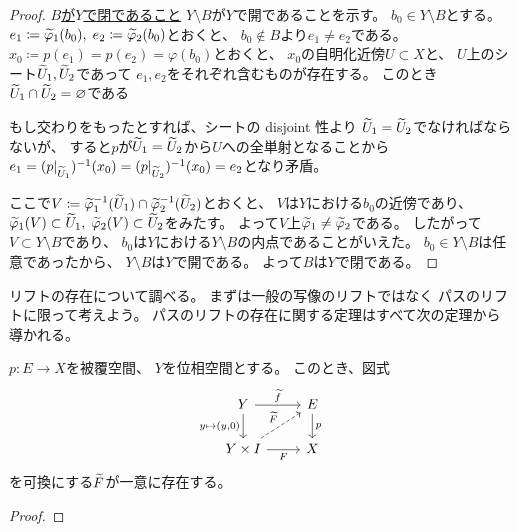 \documentclass[report]{jlreq}
\begin{document}
\begin{proof}
    \noindent
    \uline{$B$が$Y$で閉であること} \quad
    $Y \setminus B$が$Y$で開であることを示す。
    $b_0 \in Y \setminus B$とする。
    $e_1 \coloneqq \widetilde{\varphi}_1(b_0),\;
    e_2 \coloneqq \widetilde{\varphi}_2(b_0)$とおくと、
    $b_0 \not\in B$より$e_1 \neq e_2$である。
    $x_0 \coloneqq p(e_1) = p(e_2) = \varphi(b_0)$とおくと、
    $x_0$の自明化近傍$U \subset X$と、
    $U$上のシート$\widetilde{U}_1, \widetilde{U}_2$であって
    $e_1, e_2$をそれぞれ含むものが存在する。
    このとき$\widetilde{U}_1 \cap \widetilde{U}_2 = \varnothing$である
    \begin{innerproof}
        もし交わりをもったとすれば、シートの disjoint 性より
        $\widetilde{U}_1 = \widetilde{U}_2$でなければならないが、
        すると$p$が$\widetilde{U}_1 = \widetilde{U}_2$から$U$への全単射となることから
        $e_1 = (p|_{\widetilde{U}_1})^{-1}(x_0)
        = (p|_{\widetilde{U}_2})^{-1}(x_0) = e_2$となり矛盾。
    \end{innerproof}
    ここで$V \coloneqq \widetilde{\varphi}_1^{-1}(\widetilde{U}_1)
    \cap \widetilde{\varphi}_2^{-1}(\widetilde{U}_2)$とおくと、
    $V$は$Y$における$b_0$の近傍であり、
    $\widetilde{\varphi}_1(V) \subset \widetilde{U}_1,\;
    \widetilde{\varphi}_2(V) \subset \widetilde{U}_2$をみたす。
    よって$V$上$\widetilde{\varphi}_1 \neq \widetilde{\varphi}_2$である。
    したがって$V \subset Y \setminus B$であり、
    $b_0$は$Y$における$Y \setminus B$の内点であることがいえた。
    $b_0 \in Y \setminus B$は任意であったから、
    $Y \setminus B$は$Y$で開である。
    よって$B$は$Y$で閉である。
\end{proof}

リフトの存在について調べる。
まずは一般の写像のリフトではなく
パスのリフトに限って考えよう。
パスのリフトの存在に関する定理はすべて次の定理から導かれる。

\begin{theorem}[被覆ホモトピー定理]
    $p \colon E \to X$を被覆空間、
    $Y$を位相空間とする。
    このとき、図式
    \begin{equation}
        \begin{tikzcd}
            Y
                \ar{r}{\wt{f}}
                \ar{d}[swap]{y \mapsto (y, 0)}
                & E
                    \ar{d}{p} \\
            Y \times I
                \ar[dashed]{ru}{\wt{F}}
                \ar{r}[swap]{F}
                & X
        \end{tikzcd}
    \end{equation}
    を可換にする$\widetilde{F}$が一意に存在する。
\end{theorem}

\begin{proof}
    \TODO{}
\end{proof}
\end{document}
